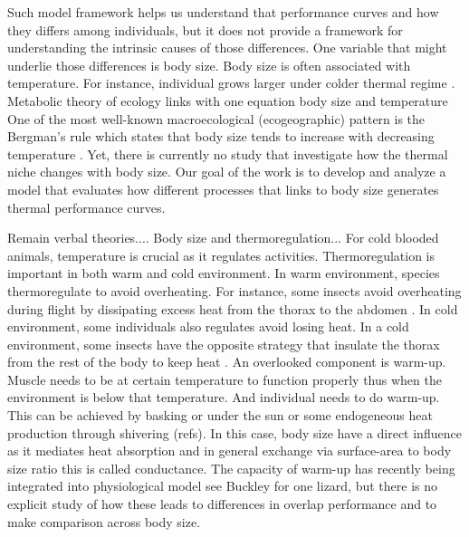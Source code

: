 Such model framework helps us understand that performance curves and how they differs  among individuals, but it does not provide a framework for understanding the intrinsic causes of those differences.
One variable that might underlie those differences is body size.
Body size is often associated with temperature.  
For instance, individual grows larger under colder thermal regime \citep{Van1996}.
Metabolic theory of ecology links with one equation body size and temperature \citep{Brown2004}
One of the most well-known macroecological (ecogeographic) pattern is the Bergman's rule which states that body size tends to increase with decreasing temperature \citep{Bergman1847}. 
Yet, there is currently no study that investigate how the thermal niche changes with body size.
Our goal of the work is to develop and analyze a model that evaluates how different processes that links to body size generates thermal performance curves.


Remain verbal theories....
Body size and thermoregulation...
For cold blooded animals, temperature is crucial as it regulates activities.
Thermoregulation is important in both warm and cold environment.
In warm environment, species thermoregulate to avoid overheating.
For instance, some insects avoid overheating during flight by dissipating excess heat from the thorax to the abdomen \citep{Verdu2012}.
In cold environment, some individuals also regulates avoid losing heat.
In a cold environment, some insects have the opposite strategy that insulate the thorax from the rest of the body to keep heat \citep{Verdu2012}.
An overlooked component is warm-up.
Muscle needs to be at certain temperature to function properly thus when the environment is below that temperature.
And individual needs to do warm-up. 
This can be achieved by basking or under the sun or some endogeneous heat production through shivering (refs).
In this case, body size have a direct influence as it mediates heat absorption and in general exchange via surface-area to body size ratio this is called conductance.
The capacity of warm-up has recently being integrated into physiological model see Buckley for one lizard,  but there is no explicit study of how these leads to differences in overlap performance and to make comparison across body size. 


